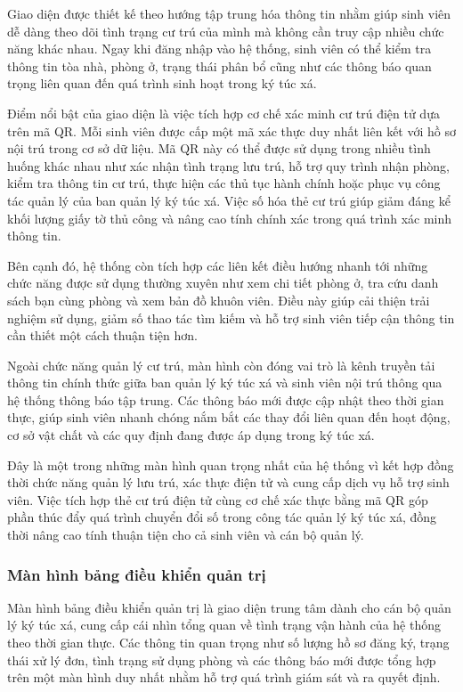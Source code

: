 \documentclass[../DoAn.tex]{subfiles}
\begin{document}
Giao diện được thiết kế theo hướng tập trung hóa thông tin nhằm giúp sinh viên
dễ dàng theo dõi tình trạng cư trú của mình mà không cần truy cập nhiều chức
năng khác nhau. Ngay khi đăng nhập vào hệ thống, sinh viên có thể kiểm tra thông
tin tòa nhà, phòng ở, trạng thái phân bổ cũng như các thông báo quan trọng liên
quan đến quá trình sinh hoạt trong ký túc xá.

Điểm nổi bật của giao diện là việc tích hợp cơ chế xác minh cư trú điện tử dựa
trên mã QR. Mỗi sinh viên được cấp một mã xác thực duy nhất liên kết với hồ sơ
nội trú trong cơ sở dữ liệu. Mã QR này có thể được sử dụng trong nhiều tình
huống khác nhau như xác nhận tình trạng lưu trú, hỗ trợ quy trình nhận phòng,
kiểm tra thông tin cư trú, thực hiện các thủ tục hành chính hoặc phục vụ công
tác quản lý của ban quản lý ký túc xá. Việc số hóa thẻ cư trú giúp giảm đáng kể
khối lượng giấy tờ thủ công và nâng cao tính chính xác trong quá trình xác minh
thông tin.

Bên cạnh đó, hệ thống còn tích hợp các liên kết điều hướng nhanh tới những chức
năng được sử dụng thường xuyên như xem chi tiết phòng ở, tra cứu danh sách bạn
cùng phòng và xem bản đồ khuôn viên. Điều này giúp cải thiện trải nghiệm sử
dụng, giảm số thao tác tìm kiếm và hỗ trợ sinh viên tiếp cận thông tin cần thiết
một cách thuận tiện hơn.

Ngoài chức năng quản lý cư trú, màn hình còn đóng vai trò là kênh truyền tải
thông tin chính thức giữa ban quản lý ký túc xá và sinh viên nội trú thông qua
hệ thống thông báo tập trung. Các thông báo mới được cập nhật theo thời gian
thực, giúp sinh viên nhanh chóng nắm bắt các thay đổi liên quan đến hoạt động,
cơ sở vật chất và các quy định đang được áp dụng trong ký túc xá.

Đây là một trong những màn hình quan trọng nhất của hệ thống vì kết hợp đồng thời
chức năng quản lý lưu trú, xác thực điện tử và cung cấp dịch vụ hỗ trợ sinh
viên. Việc tích hợp thẻ cư trú điện tử cùng cơ chế xác thực bằng mã QR góp phần
thúc đẩy quá trình chuyển đổi số trong công tác quản lý ký túc xá, đồng thời nâng
cao tính thuận tiện cho cả sinh viên và cán bộ quản lý.
\subsubsection{Màn hình bảng điều khiển quản trị}

Màn hình bảng điều khiển quản trị là giao diện trung tâm dành cho cán bộ quản lý
ký túc xá, cung cấp cái nhìn tổng quan về tình trạng vận hành của hệ thống theo
thời gian thực. Các thông tin quan trọng như số lượng hồ sơ đăng ký, trạng thái
xử lý đơn, tình trạng sử dụng phòng và các thông báo mới được tổng hợp trên một
màn hình duy nhất nhằm hỗ trợ quá trình giám sát và ra quyết định.
\end{document}
